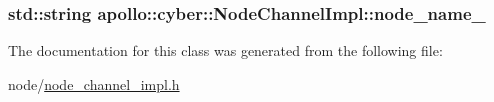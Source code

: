 \hypertarget{classapollo_1_1cyber_1_1NodeChannelImpl_a51ce4992fd91e72b19136aec54e4daad}{
\subsubsection[{node\-\_\-name\-\_\-}]{\setlength{\rightskip}{0pt plus 5cm}std\-::string apollo\-::cyber\-::\-Node\-Channel\-Impl\-::node\-\_\-name\-\_\-\hspace{0.3cm}{\ttfamily [private]}}}\label{classapollo_1_1cyber_1_1NodeChannelImpl_a51ce4992fd91e72b19136aec54e4daad}


The documentation for this class was generated from the following file\-:\begin{DoxyCompactItemize}
\item 
node/\hyperlink{node__channel__impl_8h}{node\-\_\-channel\-\_\-impl.\-h}\end{DoxyCompactItemize}
